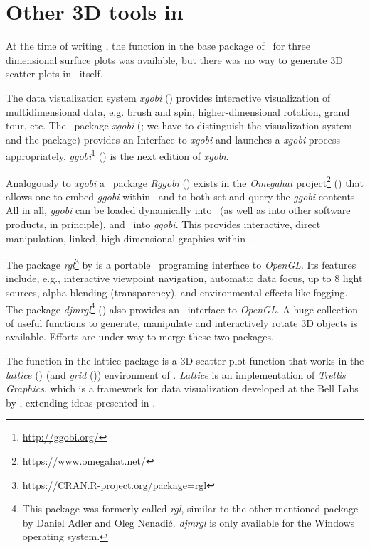 \section{Other 3D tools in \RR\label{tools}}
At the time of writing \sdd , the function  in the base
package of \RR\ for three dimensional surface plots was available, but
there was no way to generate 3D scatter plots in \RR\ itself.

The data visualization system \emph{xgobi} (\cite{swayne98}) provides
interactive visualization of multidimensional data, e.g. brush and spin,
higher-dimensional rotation, grand tour, etc.  The \RR\ package
\emph{xgobi} (\cite{swayne91}; we have to distinguish the visualization
system and the package) provides an Interface to \emph{xgobi} and launches
a \emph{xgobi} process appropriately.
\emph{ggobi}\footnote{\url{http://ggobi.org/}}
(\cite{swayne02}) is the next edition of \emph{xgobi}.

Analogously to \emph{xgobi} a \RR\ package \emph{Rggobi} (\cite{temple01})
exists in the \emph{Omegahat} project\footnote{\url{https://www.omegahat.net/}}
(\cite{temple00}) that allows one to embed \emph{ggobi} within
\RR\ and to both set and query the \emph{ggobi} contents.  All in all,
\emph{ggobi} can be loaded dynamically into \RR\ (as well as into other
software products, in principle), and \RR\ into \emph{ggobi}.  This
provides interactive, direct manipulation, linked, high-dimensional
graphics within \RR .

The package \emph{rgl}\footnote{\url{https://CRAN.R-project.org/package=rgl}}
by \cite{AdlerNenadic2003} is a portable \RR\ programing interface to \emph{OpenGL}.
Its features include, e.g., interactive viewpoint navigation,
automatic data focus, up to 8 light sources, alpha-blending
(transparency), and environmental effects like fogging.
The package \emph{djmrgl}\footnote{This package was
formerly called \emph{rgl}, similar to the other mentioned package
by Daniel Adler and Oleg Nenadi\'{c}.
\emph{djmrgl} is only available for the Windows operating system.}
(\cite{murdoch}) also provides an \RR\ interface to \emph{OpenGL}.
A huge collection of useful functions to generate,
manipulate and interactively rotate 3D objects is available.
Efforts are under way to merge these two packages.

The function  in the lattice package is a 3D scatter plot function that works in the
\emph{lattice} (\cite{sarkar02}) (and \emph{grid} (\cite{murrell01}))
environment of \RR .
\emph{Lattice} is an implementation of \emph{Trellis Graphics}, which is a
framework for data visualization developed at the Bell Labs by
, extending ideas presented in .

